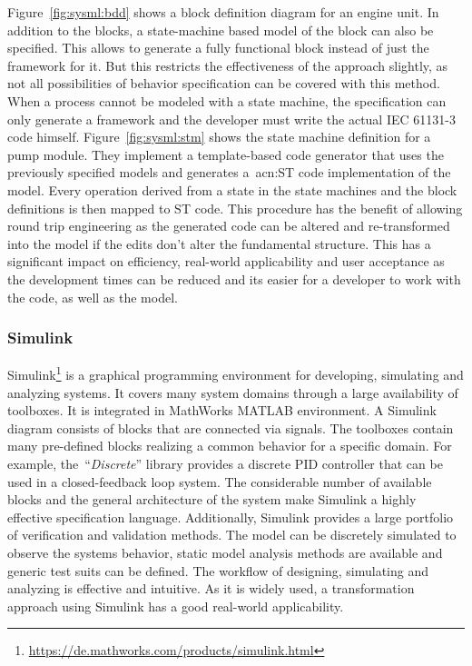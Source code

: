 Figure~\ref{fig:sysml:bdd} shows a block definition diagram for an engine unit.
In addition to the blocks, a state-machine based model of the block can also be specified.
This allows to generate a fully functional block instead of just the framework for it.
But this restricts the effectiveness of the approach slightly, as not all possibilities of behavior specification can be covered with this method.
When a process cannot be modeled with a state machine, the specification can only generate a framework and the developer must write the actual IEC 61131-3 code himself.
Figure~\ref{fig:sysml:stm} shows the state machine definition for a pump module.
They implement a template-based code generator that uses the previously specified models and generates a~\acrshort{acn:ST} code implementation of the model.
Every operation derived from a state in the state machines and the block definitions is then mapped to ST code.
This procedure has the benefit of allowing round trip engineering as the generated code can be altered and re-transformed into the model if the edits don't alter the fundamental structure.
This has a significant impact on efficiency, real-world applicability and user acceptance as the development times can be reduced and its easier for a developer to work with the code, as well as the model.
\subsubsection{Simulink}
\label{sec:sub:simulink}
Simulink\footnote{\url{https://de.mathworks.com/products/simulink.html}} is a graphical programming environment for developing, simulating and analyzing systems.
It covers many system domains through a large availability of toolboxes.
It is integrated in MathWorks MATLAB environment.
A Simulink diagram consists of blocks that are connected via signals.
The toolboxes contain many pre-defined blocks realizing a common behavior for a specific domain.
For example, the~\enquote{\textit{Discrete}} library provides a discrete PID controller that can be used in a closed-feedback loop system.
The considerable number of available blocks and the general architecture of the system make Simulink a highly effective specification language.
Additionally, Simulink provides a large portfolio of verification and validation methods.
The model can be discretely simulated to observe the systems behavior, static model analysis methods are available and generic test suits can be defined.
The workflow of designing, simulating and analyzing is effective and intuitive.
As it is widely used, a transformation approach using Simulink has a good real-world applicability.

